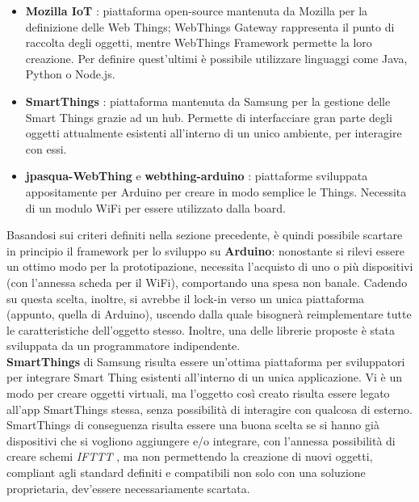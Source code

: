 \documentclass[12pt,a4paper,openright,oneside]{report}
\begin{document}
\begin{itemize}
	\item \textbf{Mozilla IoT} \cite{mozilla-iot}: piattaforma open-source mantenuta da Mozilla per la definizione delle Web Things; WebThings Gateway rappresenta il punto di raccolta degli oggetti, mentre WebThings Framework permette la loro creazione. Per definire quest'ultimi è possibile utilizzare linguaggi come Java, Python o Node.js.
	
	\item \textbf{SmartThings} \cite{smartthings}: piattaforma mantenuta da Samsung per la gestione delle Smart Things grazie ad un hub. Permette di interfacciare gran parte degli oggetti attualmente esistenti all'interno di un unico ambiente, per interagire con essi.
	
	\item \textbf{jpasqua-WebThing} \cite{jpasqua} e \textbf{webthing-arduino} \cite{wtarduino}: piattaforme sviluppata appositamente per Arduino per creare in modo semplice le Things. Necessita di un modulo WiFi per essere utilizzato dalla board.
\end{itemize}

Basandosi sui criteri definiti nella sezione precedente, è quindi possibile scartare in principio il framework per lo sviluppo su \textbf{Arduino}: nonostante si rilevi essere un ottimo modo per la prototipazione, necessita l'acquisto di uno o più dispositivi (con l'annessa scheda per il WiFi), comportando una spesa non banale. Cadendo su questa scelta, inoltre, si avrebbe il lock-in verso un unica piattaforma (appunto, quella di Arduino), uscendo dalla quale bisognerà reimplementare tutte le caratteristiche dell'oggetto stesso. Inoltre, una delle librerie proposte è stata sviluppata da un programmatore indipendente.\\

\textbf{SmartThings} di Samsung risulta essere un'ottima piattaforma per sviluppatori per integrare Smart Thing esistenti all'interno di un unica applicazione. Vi è un modo per creare oggetti virtuali, ma l'oggetto così creato risulta essere legato all'app SmartThings stessa, senza possibilità di interagire con qualcosa di esterno. SmartThings di conseguenza risulta essere una buona scelta se si hanno già dispositivi che si vogliono aggiungere e/o integrare, con l'annessa possibilità di creare schemi \textit{IFTTT} \cite{ifttt}, ma non permettendo la creazione di nuovi oggetti, compliant agli standard definiti e compatibili non solo con una soluzione proprietaria, dev'essere necessariamente scartata.\\
\end{document}
